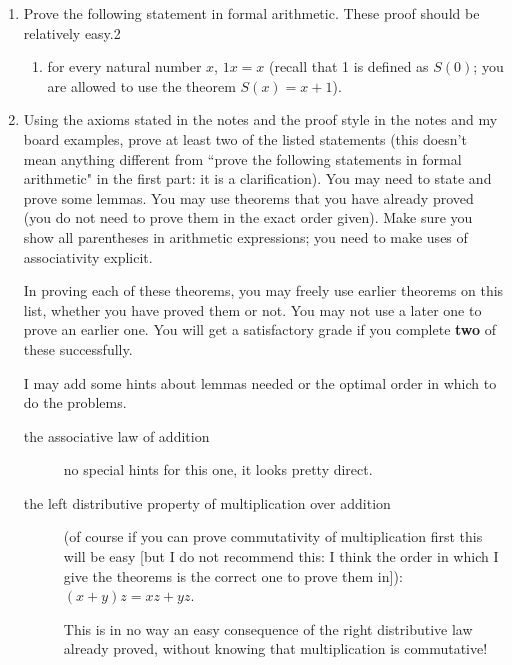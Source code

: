 \documentclass[12pt]{article}
\begin{document}
\begin{enumerate}

\item Prove  the following statement in formal arithmetic.  These proof should be relatively easy.2

\begin{enumerate}

\item for every natural number $x$, $1x = x$ (recall that 1 is defined as $S(0)$; you are allowed to use the theorem $S(x)=x+1$).


\end{enumerate}

\item Using the axioms stated in the notes and the proof style in the notes and my board examples, prove at least two of the listed statements (this doesn't mean anything different from ``prove the following statements in formal arithmetic" in the first part:  it is a clarification).   You may need to state and prove some lemmas.  You may use theorems that you have already proved (you do not need to prove them in the exact order given).  Make sure you show all parentheses in arithmetic expressions; you need to make uses of associativity explicit.

In proving each of these theorems, you may freely use earlier theorems on this list, whether you have proved them or not.   You may not use a later one to prove an earlier one.  You will get a satisfactory grade if you complete {\bf two} of these successfully.

I may add some hints about lemmas needed or the optimal order in which to do the problems.

\begin{description}

\item  [the associative law of addition]

no special hints for this one, it looks pretty direct.

\item  [the left distributive property of multiplication  over addition] (of course if you can prove commutativity of multiplication first this will be easy [but I do not recommend this:  I think the order in which I give the theorems is the correct one to prove them in]):
$(x+y)z = xz+yz$.

This is in no way an easy consequence of the right distributive law already proved, without knowing that multiplication is commutative!


\end{description}
\end{enumerate}
\end{document}
